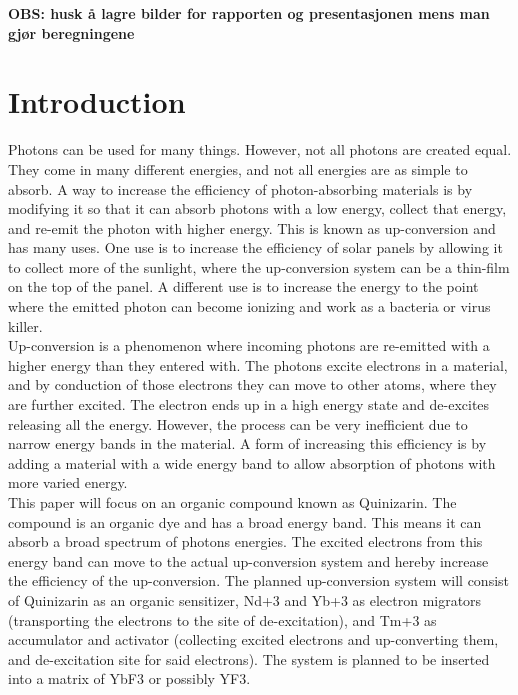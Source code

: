 \documentclass{article}
\begin{document}
\vspace{1cm}

\textbf{\large{OBS: husk å lagre bilder for rapporten og presentasjonen mens man gjør beregningene}}

\section{Introduction}  \label{sec:Introduction}

    Photons can be used for many things. However, not all photons are created equal. They come in many different energies, and not all energies are as simple to absorb. A way to increase the efficiency of photon-absorbing materials is by modifying it so that it can absorb photons with a low energy, collect that energy, and re-emit the photon with higher energy. This is known as up-conversion and has many uses. One use is to increase the efficiency of solar panels by allowing it to collect more of the sunlight, where the up-conversion system can be a thin-film on the top of the panel. A different use is to increase the energy to the point where the emitted photon can become ionizing and work as a bacteria or virus killer.\\

    Up-conversion is a phenomenon where incoming photons are re-emitted with a higher energy than they entered with. The photons excite electrons in a material, and by conduction of those electrons they can move to other atoms, where they are further excited. The electron ends up in a high energy state and de-excites releasing all the energy. However, the process can be very inefficient due to narrow energy bands in the material. A form of increasing this efficiency is by adding a material with a wide energy band to allow absorption of photons with more varied energy.\\

    This paper will focus on an organic compound known as Quinizarin. The compound is an organic dye and has a broad energy band. This means it can absorb a broad spectrum of photons energies. The excited electrons from this energy band can move to the actual up-conversion system and hereby increase the efficiency of the up-conversion. The planned up-conversion system will consist of Quinizarin as an organic sensitizer, Nd+3 and Yb+3 as electron migrators (transporting the electrons to the site of de-excitation), and Tm+3 as accumulator and activator (collecting excited electrons and up-converting them, and de-excitation site for said electrons). The system is planned to be inserted into a matrix of YbF3 or possibly YF3.\\
\end{document}
